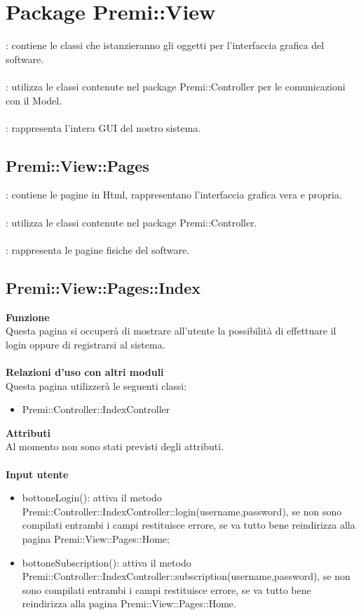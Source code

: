 \section{Package Premi::View}{
		\textbf{\tipo}: contiene le classi che istanzieranno gli oggetti per l'interfaccia grafica del software.\\\\
		\textbf{\relaz}: utilizza le classi contenute nel package Premi::Controller per le comunicazioni con il Model.\\\\
		\textbf{\attivita}: rappresenta l'intera GUI del nostro sistema.
		\subsection{Premi::View::Pages}{
			\textbf{\tipo}: contiene le pagine in Html, rappresentano l'interfaccia grafica vera e propria.\\\\
			\textbf{\relaz}: utilizza le classi contenute nel package Premi::Controller.\\\\
			\textbf{\attivita}: rappresenta le pagine fisiche del software.
			}
			\subsection{Premi::View::Pages::Index}{
					\textbf{Funzione}\\
						\indent Questa pagina si occuperà di mostrare all'utente la possibilità di effettuare il login oppure di registrarsi al sistema.\\\\
					\textbf{Relazioni d'uso con altri moduli}\\
						\indent Questa pagina utilizzerà le seguenti classi:
					\begin{itemize}
						\item Premi::Controller::IndexController
					\end{itemize}
					\textbf{Attributi}\\
						\indent Al momento non sono stati previsti degli attributi.\\\\
					\textbf{Input utente}
						\begin{itemize}
						\item bottoneLogin(): attiva il metodo Premi::Controller::IndexController::login(username,password), se non sono compilati entrambi i campi restituisce errore, se va tutto bene reindirizza alla pagina Premi::View::Pages::Home;
						\item bottoneSubscription(): attiva il metodo Premi::Controller::IndexController::subscription(username,password), se non sono compilati entrambi i campi restituisce errore, se va tutto bene reindirizza alla pagina Premi::View::Pages::Home.
					\end{itemize}
				}
}
